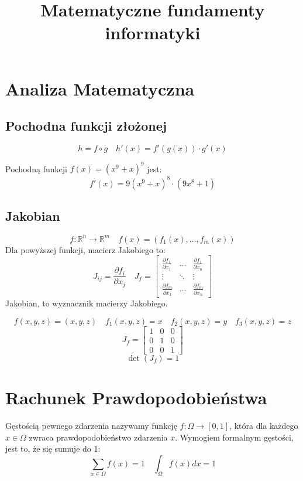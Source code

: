\documentclass{../notatki}
\title{Matematyczne fundamenty informatyki}
\begin{document}
\section{Analiza Matematyczna}

\subsection{Pochodna funkcji złożonej}
$$
h = f \circ g \quad h'(x) = f'(g(x)) \cdot g'(x)
$$

\begin{examplebox}
  Pochodną funkcji $f(x) = (x^9 + x)^9$ jest:
  $$
  f'(x) = 9(x^9 + x)^8 \cdot (9x^8 + 1)
  $$
\end{examplebox}

\subsection{Jakobian}
$$
f: \mathbb{R}^n \to \mathbb{R}^m \quad f(x) = (f_1(x), \dots, f_m(x))
$$
Dla powyższej funkcji, macierz Jakobiego to:
$$
J_{ij} = \frac{\partial f_i}{\partial x_j} \quad J_f =
\begin{bmatrix}
  \frac{\partial f_1}{\partial x_1} & \dots & \frac{\partial
  f_1}{\partial x_n} \\
  \vdots & \ddots & \vdots \\
  \frac{\partial f_m}{\partial x_1} & \dots & \frac{\partial f_m}{\partial x_n}
\end{bmatrix}
$$
Jakobian, to wyznacznik macierzy Jakobiego.

\begin{examplebox}
  $$
  f(x, y, z) = (x, y, z) \quad f_1(x, y, z) = x \quad f_2(x, y, z) =
  y \quad f_3(x, y, z) = z
  $$
  $$
  J_f =
  \begin{bmatrix}
    1 & 0 & 0 \\
    0 & 1 & 0 \\
    0 & 0 & 1
  \end{bmatrix}
  $$
  $$
  \det(J_f) = 1
  $$
\end{examplebox}

\section{Rachunek Prawdopodobieństwa}

Gęstością pewnego zdarzenia nazywamy funkcję $f: \Omega \to [0, 1]$, która
dla każdego $x \in \Omega$ zwraca prawdopodobieństwo zdarzenia $x$.
Wymogiem formalnym gęstości, jest to, że się sumuje do 1:
$$
\sum_{x \in \Omega} f(x) = 1 \quad \int_{\Omega} f(x) dx = 1
$$
\end{document}
